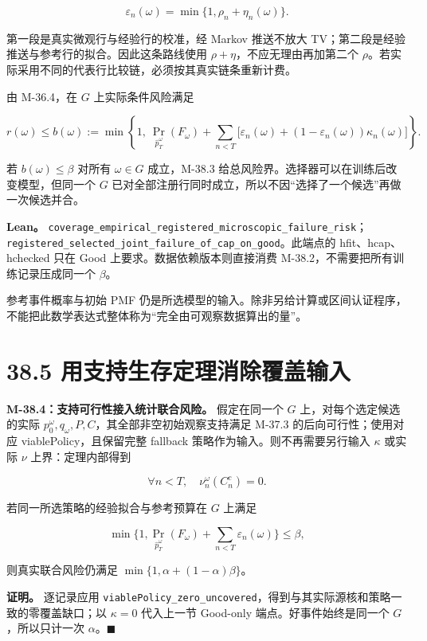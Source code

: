 \documentclass[
  11pt,
  oneside]{book}
\begin{document}
\[\varepsilon_n(\omega)=\min\{1,\rho_n+\eta_n(\omega)\}.\]

第一段是真实微观行与经验行的校准，经 Markov 推送不放大 TV；第二段是经验推送与参考行的拟合。因此这条路线使用 \(\rho+\eta\)，不应无理由再加第二个 \(\rho\)。若实际采用不同的代表行比较链，必须按其真实链条重新计费。

由 M-36.4，在 \(G\) 上实际条件风险满足

\[r(\omega)\le b(\omega):=
\min\left\{1,\
\Pr_{\widehat p_T^\omega}(F_\omega)+
\sum_{n<T}\bigl[
\varepsilon_n(\omega)+
(1-\varepsilon_n(\omega))\kappa_n(\omega)
\bigr]\right\}.\]

若 \(b(\omega)\le\beta\) 对所有 \(\omega\in G\) 成立，M-38.3 给总风险界。选择器可以在训练后改变模型，但同一个 \(G\) 已对全部注册行同时成立，所以不因``选择了一个候选''再做一次候选并合。

\textbf{Lean。} \nolinkurl{coverage_empirical_registered_microscopic_failure_risk}；\nolinkurl{registered_selected_joint_failure_of_cap_on_good}。此端点的 hfit、hcap、hchecked 只在 Good 上要求。数据依赖版本则直接消费 M-38.2，不需要把所有训练记录压成同一个 \(\beta\)。

参考事件概率与初始 PMF 仍是所选模型的输入。除非另给计算或区间认证程序，不能把此数学表达式整体称为``完全由可观察数据算出的量''。

\section{38.5 用支持生存定理消除覆盖输入}\label{ux7528ux652fux6301ux751fux5b58ux5b9aux7406ux6d88ux9664ux8986ux76d6ux8f93ux5165}

\hypertarget{m-38-4}{}\label{m-38-4}

\textbf{M-38.4：支持可行性接入统计联合风险。} 假定在同一个 \(G\) 上，对每个选定候选的实际 \(p_0^\omega,q_\omega,P,C\)，其全部非空初始观察支持满足 M-37.3 的后向可行性；使用对应 viablePolicy，且保留完整 fallback 策略作为输入。则不再需要另行输入 \(\kappa\) 或实际 \(\nu\) 上界：定理内部得到

\[\forall n<T,\quad \nu_n^\omega(C_n^c)=0.\]

若同一所选策略的经验拟合与参考预算在 \(G\) 上满足

\[\min\{1,\Pr_{\widehat p_T^\omega}(F_\omega)
+\sum_{n<T}\varepsilon_n(\omega)\}\le\beta,\]

则真实联合风险仍满足 \(\min\{1,\alpha+(1-\alpha)\beta\}\)。

\textbf{证明。} 逐记录应用 \nolinkurl{viablePolicy_zero_uncovered}，得到与其实际源核和策略一致的零覆盖缺口；以 \(\kappa=0\) 代入上一节 Good-only 端点。好事件始终是同一个 \(G\)，所以只计一次 \(\alpha\)。\(\blacksquare\)
\end{document}
